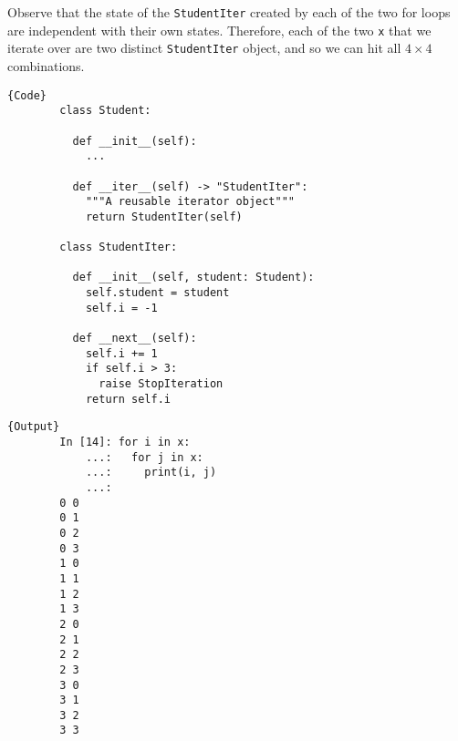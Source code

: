   \begin{theorem}
    Observe that the state of the \texttt{StudentIter} created by each of the two for loops are independent with their own states. Therefore, each of the two \texttt{x} that we iterate over are two distinct \texttt{StudentIter} object, and so we can hit all $4 \times 4$ combinations. 

    \noindent\begin{minipage}{.5\textwidth}
      \begin{lstlisting}[]{Code}
        class Student: 

          def __init__(self): 
            ...

          def __iter__(self) -> "StudentIter":  
            """A reusable iterator object"""
            return StudentIter(self)

        class StudentIter: 

          def __init__(self, student: Student): 
            self.student = student 
            self.i = -1

          def __next__(self): 
            self.i += 1  
            if self.i > 3: 
              raise StopIteration
            return self.i
      \end{lstlisting}
      \end{minipage}
      \hfill
      \begin{minipage}{.49\textwidth}
      \begin{lstlisting}[]{Output}
        In [14]: for i in x:
            ...:   for j in x:
            ...:     print(i, j)
            ...: 
        0 0
        0 1
        0 2
        0 3
        1 0
        1 1
        1 2
        1 3
        2 0
        2 1
        2 2
        2 3
        3 0
        3 1
        3 2
        3 3
      \end{lstlisting}
    \end{minipage}
  \end{theorem}

